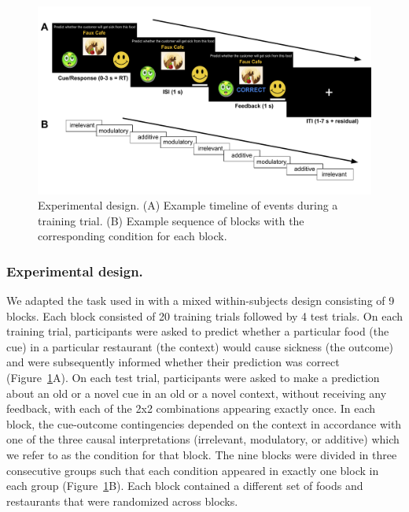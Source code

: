 \documentclass[10pt,letterpaper]{article}
\begin{document}
\begin{figure}[ht]
\begin{center}
\includegraphics[scale=0.34,  trim = 10 50 0 20]{task-design.pdf}
\end{center}
\vspace{-1em}
\caption{Experimental design. (A) Example timeline of events during a training trial. (B) Example sequence of blocks with the corresponding condition for each block. } 
\label{task-design}
\end{figure}

\subsubsection{Experimental design.} 

We adapted the task used in  with a mixed within-subjects design consisting of 9 blocks. Each block consisted of 20 training trials followed by 4 test trials. On each training trial, participants were asked to predict whether a particular food (the cue) in a particular restaurant (the context) would cause sickness (the outcome) and were subsequently informed whether their prediction was correct (Figure~\ref{task-design}A). On each test trial, participants were asked to make a prediction about an old or a novel cue in an old or a novel context, without receiving any feedback, with each of the 2x2 combinations appearing exactly once. In each block, the cue-outcome contingencies depended on the context in accordance with one of the three causal interpretations (irrelevant, modulatory, or additive) which we refer to as the condition for that block. The nine blocks were divided in three consecutive groups such that each condition appeared in exactly one block in each group (Figure~\ref{task-design}B). Each block contained a different set of foods and restaurants that were randomized across blocks.
\\
\end{document}
